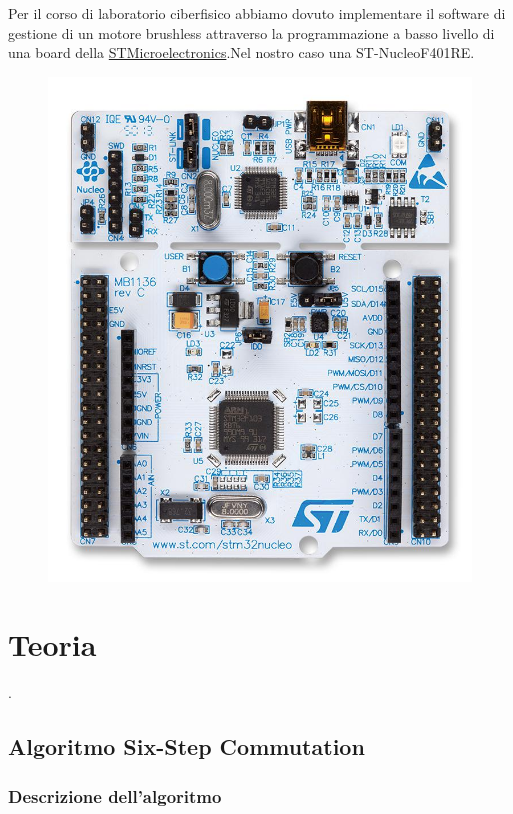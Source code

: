 \documentclass[a4paper]{report}
\begin{document}
    \newpage
    Per il corso di laboratorio ciberfisico abbiamo dovuto implementare il software di gestione di un motore brushless attraverso la programmazione a basso livello di una board della \href{https://www.st.com/}{STMicroelectronics}.Nel nostro caso una ST-NucleoF401RE.
    \begin{figure}[h]
    \centering
    \includegraphics[scale=0.2, keepaspectratio=true]{nucleo}
    \end{figure}

    \newpage
\chapter{Teoria}.
\section{Algoritmo Six-Step Commutation}


    \subsection{Descrizione dell'algoritmo}
\end{document}
